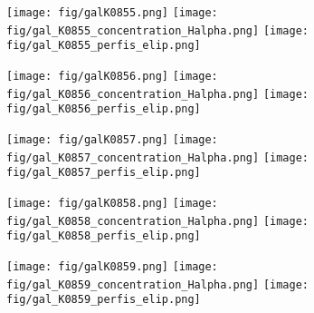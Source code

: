 \begin{figure}[!ht]
\begin{center}
\setcaptionmargin{1cm}
\texttt{[image: fig/galK0855.png]}
\texttt{[image: fig/gal\_K0855\_concentration\_Halpha.png]}
\texttt{[image: fig/gal\_K0855\_perfis\_elip.png]}
\end{center}
\end{figure}


\begin{figure}[!ht]
\begin{center}
\setcaptionmargin{1cm}
\texttt{[image: fig/galK0856.png]}
\texttt{[image: fig/gal\_K0856\_concentration\_Halpha.png]}
\texttt{[image: fig/gal\_K0856\_perfis\_elip.png]}
\end{center}
\end{figure}


\begin{figure}[!ht]
\begin{center}
\setcaptionmargin{1cm}
\texttt{[image: fig/galK0857.png]}
\texttt{[image: fig/gal\_K0857\_concentration\_Halpha.png]}
\texttt{[image: fig/gal\_K0857\_perfis\_elip.png]}
\end{center}
\end{figure}


\begin{figure}[!ht]
\begin{center}
\setcaptionmargin{1cm}
\texttt{[image: fig/galK0858.png]}
\texttt{[image: fig/gal\_K0858\_concentration\_Halpha.png]}
\texttt{[image: fig/gal\_K0858\_perfis\_elip.png]}
\end{center}
\end{figure}


\begin{figure}[!ht]
\begin{center}
\setcaptionmargin{1cm}
\texttt{[image: fig/galK0859.png]}
\texttt{[image: fig/gal\_K0859\_concentration\_Halpha.png]}
\texttt{[image: fig/gal\_K0859\_perfis\_elip.png]}
\end{center}
\end{figure}


